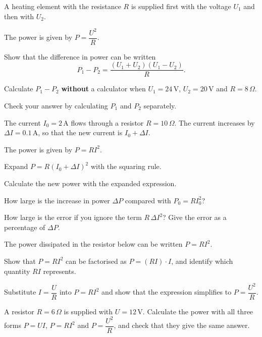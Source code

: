 A heating element with the resistance $R$ is supplied first with the voltage $U_1$ and then with
$U_2$.


The power is given by $P = \dfrac{U^2}{R}$.
\begin{parts}
  \item Show that the difference in power can be written
    \[
      P_1 - P_2 = \frac{(U_1 + U_2)(U_1 - U_2)}{R}.
    \]
  \item Calculate $P_1 - P_2$ \textbf{without} a calculator when $U_1 = 24\,\text{V}$,
    $U_2 = 20\,\text{V}$ and $R = 8\,\Omega$.
  \item Check your answer by calculating $P_1$ and $P_2$ separately.
\end{parts}

The current $I_0 = 2\,\text{A}$ flows through a resistor $R = 10\,\Omega$. The current increases by
$\Delta I = 0.1\,\text{A}$, so that the new current is $I_0 + \Delta I$.


The power is given by $P = RI^2$.
\begin{parts}
  \item Expand $P = R(I_0 + \Delta I)^2$ with the squaring rule.
  \item Calculate the new power with the expanded expression.
  \item How large is the increase in power $\Delta P$ compared with $P_0 = RI_0^2$?
  \item How large is the error if you ignore the term $R\,\Delta I^2$? Give the error as a
    percentage of $\Delta P$.
\end{parts}

The power dissipated in the resistor below can be written $P = RI^2$.


\begin{parts}
  \item Show that $P = RI^2$ can be factorised as $P = (RI) \cdot I$, and identify which quantity
    $RI$ represents.
  \item Substitute $I = \dfrac{U}{R}$ into $P = RI^2$ and show that the expression simplifies to
    $P = \dfrac{U^2}{R}$.
  \item A resistor $R = 6\,\Omega$ is supplied with $U = 12\,\text{V}$. Calculate the power with
    all three forms $P = UI$, $P = RI^2$ and $P = \dfrac{U^2}{R}$, and check that they give the
    same answer.
\end{parts}

